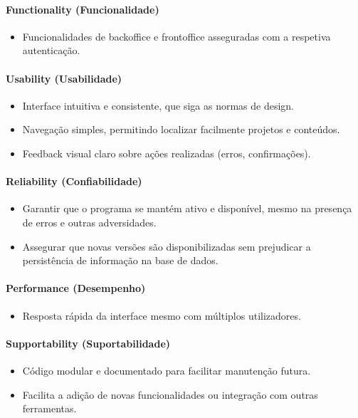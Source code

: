 \paragraph{Functionality (Funcionalidade)}
\begin{itemize}
    \item Funcionalidades de backoffice e frontoffice asseguradas com a respetiva autenticação.
\end{itemize}

\paragraph{Usability (Usabilidade)}
\begin{itemize}
    \item Interface intuitiva e consistente, que siga as normas de design.
    \item Navegação simples, permitindo localizar facilmente projetos e conteúdos.
    \item Feedback visual claro sobre ações realizadas (erros, confirmações).
\end{itemize}

\paragraph{Reliability (Confiabilidade)}
\begin{itemize}
    \item Garantir que o programa se mantém ativo e disponível, mesmo na presença de erros e outras adversidades.
    \item Assegurar que novas versões são disponibilizadas sem prejudicar a persistência de informação na base de dados.
\end{itemize}

\paragraph{Performance (Desempenho)}
\begin{itemize}
    \item Resposta rápida da interface mesmo com múltiplos utilizadores.
\end{itemize}

\paragraph{Supportability (Suportabilidade)}
\begin{itemize}
    \item Código modular e documentado para facilitar manutenção futura.
    \item Facilita a adição de novas funcionalidades ou integração com outras ferramentas.
\end{itemize}


